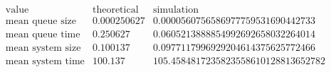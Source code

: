 \[\begin{array}{cccc}
 \text{value} & \text{theoretical} & \text{simulation} & \text{} \\
 \text{mean queue size} & 0.000250627 & 0.0000560756586977759531690442733 & \text{} \\
 \text{mean queue time} & 0.250627 & 0.0605213888854992692658032264014 & \text{} \\
 \text{mean system size} & 0.100137 & 0.0977117996929204614375625772466 & \text{} \\
 \text{mean system time} & 100.137 & 105.4584817235823558610128813652782 & \text{} \\
\end{array}\]

